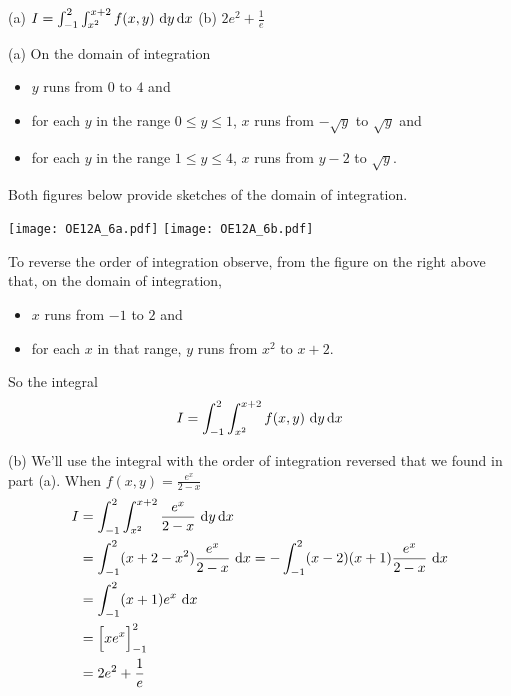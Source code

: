 %

\begin{answer}
(a) $I = \int_{-1}^2\int_{x^2}^{x+2} f(x,y)\ \mathrm{d}y\,\mathrm{d}x$\qquad
(b) $ 2e^2 + \frac{1}{e}$
\end{answer}

\begin{solution}
(a)  On the domain of integration
\begin{itemize}
\item 
  $y$ runs from $0$ to $4$ and
\item
  for each $y$ in the range $0\le y\le 1$, $x$ runs from $-\sqrt{y}$ 
to $\sqrt{y}$ and
\item
  for each $y$ in the range $1\le y\le 4$, $x$ runs from $y-2$ 
to $\sqrt{y}$.
\end{itemize}
Both figures below provide sketches of the domain of integration.

\begin{center}
     \texttt{[image: OE12A\_6a.pdf]}\qquad
     \texttt{[image: OE12A\_6b.pdf]}
\end{center}

To reverse the order of integration observe, from the figure on the
right above that, on the domain of integration,
\begin{itemize}
\item 
  $x$ runs from $-1$ to $2$ and
\item
  for each $x$ in that range, $y$ runs from $x^2$ 
  to $x+2$.
\end{itemize}
So the integral
\begin{equation*}
I = \int_{-1}^2\int_{x^2}^{x+2} f(x,y)\ \mathrm{d}y\,\mathrm{d}x
\end{equation*}

(b) We'll use the integral with the order of integration reversed
that we found in part (a). When $f(x,y)=\frac{e^x}{2-x}$
\begin{align*}
I &= \int_{-1}^2\int_{x^2}^{x+2} \frac{e^x}{2-x}\ \mathrm{d}y\,\mathrm{d}x \\
  &= \int_{-1}^2 (x+2-x^2)\frac{e^x}{2-x}\ \mathrm{d}x 
   = -\int_{-1}^2 (x-2)(x+1)\frac{e^x}{2-x}\ \mathrm{d}x \\
  &= \int_{-1}^2 (x+1) e^x\ \mathrm{d}x \\
  &= \Big[xe^x\Big]_{-1}^2 \\
  &= 2e^2 + \frac{1}{e}
\end{align*}
\end{solution}

